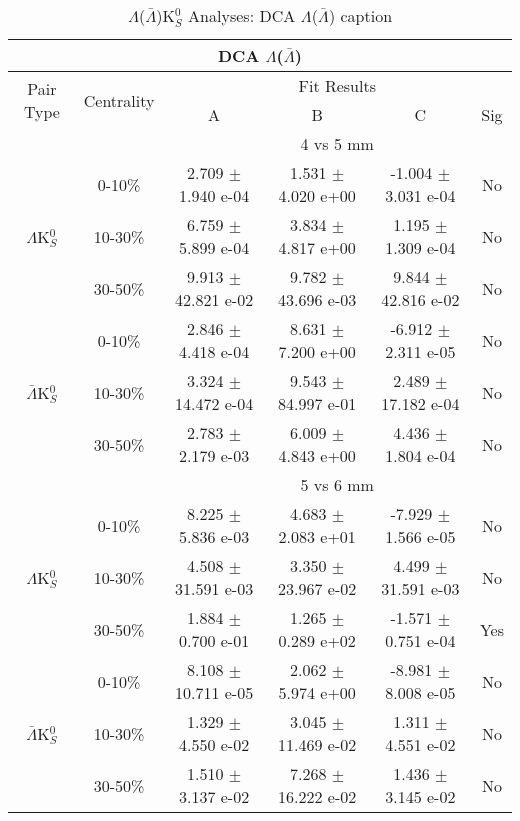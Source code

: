 \documentclass[../AnalysisNoteJBuxton.tex]{subfiles}
\begin{document}
\begin{table}
 \centering
 \begin{tabular}{|c|c|c|c|c|c|}
  \multicolumn{6}{c}{DCA $\Lambda$($\bar{\Lambda}$)} \\
  \hline
  \multirow{2}{*}{Pair Type} & \multirow{2}{*}{Centrality} & \multicolumn{4}{c|}{Fit Results} \\
  \cline{3-6}
   & & A & B & C & Sig \\  
  \hline
  \multicolumn{2}{|c}{} & \multicolumn{4}{c|}{4 vs 5 mm} \\  
  \hline  
  \multirow{3}{*}{$\Lambda$K$^{0}_{S}$}
   &  0-10\% & 2.709 $\pm$ 1.940 e-04 & 1.531 $\pm$ 4.020 e+00 & -1.004 $\pm$ 3.031 e-04 & No \\
   & 10-30\% & 6.759 $\pm$ 5.899 e-04 & 3.834 $\pm$ 4.817 e+00 & 1.195 $\pm$ 1.309 e-04 & No \\
   & 30-50\% & 9.913 $\pm$ 42.821 e-02 & 9.782 $\pm$ 43.696 e-03 & 9.844 $\pm$ 42.816 e-02 & No \\
  \hline
  \multirow{3}{*}{$\bar{\Lambda}$K$^{0}_{S}$}  
   &  0-10\% & 2.846 $\pm$ 4.418 e-04 & 8.631 $\pm$ 7.200 e+00 & -6.912 $\pm$ 2.311 e-05 & No \\
   & 10-30\% & 3.324 $\pm$ 14.472 e-04 & 9.543 $\pm$ 84.997 e-01 & 2.489 $\pm$ 17.182 e-04 & No \\
   & 30-50\% & 2.783 $\pm$ 2.179 e-03 & 6.009 $\pm$ 4.843 e+00 & 4.436 $\pm$ 1.804 e-04 & No \\
  \hline 
  \multicolumn{2}{|c}{} & \multicolumn{4}{c|}{5 vs 6 mm} \\
  \hline  
  \multirow{3}{*}{$\Lambda$K$^{0}_{S}$}   
   &  0-10\% & 8.225 $\pm$ 5.836 e-03 & 4.683 $\pm$ 2.083 e+01 & -7.929 $\pm$ 1.566 e-05 & No \\
   & 10-30\% & 4.508 $\pm$ 31.591 e-03 & 3.350 $\pm$ 23.967 e-02 & 4.499 $\pm$ 31.591 e-03 & No \\
   & 30-50\% & 1.884 $\pm$ 0.700 e-01 & 1.265 $\pm$ 0.289 e+02 & -1.571 $\pm$ 0.751 e-04 & Yes \\
  \hline  
  \multirow{3}{*}{$\bar{\Lambda}$K$^{0}_{S}$}
   &  0-10\% & 8.108 $\pm$ 10.711 e-05 & 2.062 $\pm$ 5.974 e+00 & -8.981 $\pm$ 8.008 e-05 & No \\
   & 10-30\% & 1.329 $\pm$ 4.550 e-02 & 3.045 $\pm$ 11.469 e-02 & 1.311 $\pm$ 4.551 e-02 & No \\
   & 30-50\% & 1.510 $\pm$ 3.137 e-02 & 7.268 $\pm$ 16.222 e-02 & 1.436 $\pm$ 3.145 e-02 & No \\
  \hline
 \end{tabular}
 \caption{$\Lambda$($\bar{\Lambda}$)K$^{0}_{S}$ Analyses: DCA $\Lambda$($\bar{\Lambda}$) caption}
 \label{tab:LamDcaLamK0Full}
\end{table}
\end{document}

